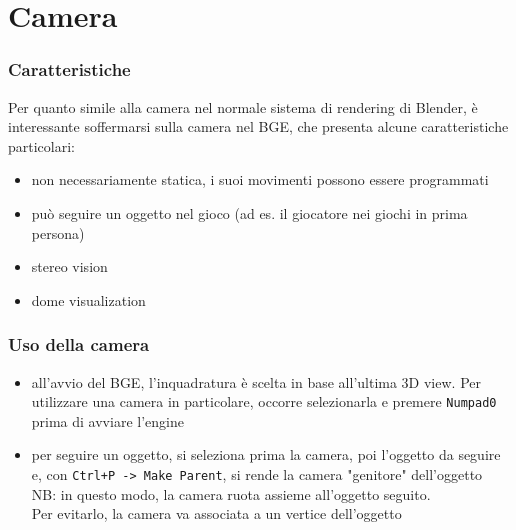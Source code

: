 \documentclass{beamer}
\def\code#1{\texttt{#1}}
\begin{document}
	\section{Camera}
	\begin{frame}
	\frametitle{Caratteristiche}
		Per quanto simile alla camera nel normale sistema di rendering di Blender, è interessante soffermarsi sulla camera nel BGE, che presenta alcune caratteristiche particolari:
		\begin{itemize}
			\item non necessariamente statica, i suoi movimenti possono essere programmati
			\item può seguire un oggetto nel gioco (ad es. il giocatore nei giochi in prima persona)
			\item stereo vision
			\item dome visualization
		\end{itemize}
	\end{frame}	
	\begin{frame}
	\frametitle{Uso della camera}
	\begin{itemize}
		\item all'avvio del BGE, l'inquadratura è scelta in base all'ultima 3D view. Per utilizzare una camera in particolare, occorre selezionarla e premere \code{Numpad0} prima di avviare l'engine
		\item per seguire un oggetto, si seleziona prima la camera, poi l'oggetto da seguire e, con \code{Ctrl+P -> Make Parent}, si rende la camera "genitore" dell'oggetto \\ {\footnotesize \hspace{1em} NB: in questo modo, la camera ruota assieme all'oggetto seguito. \\ \hspace{1em} Per evitarlo, la camera va associata a un vertice dell'oggetto}
	\end{itemize}
	\end{frame}
\end{document}
